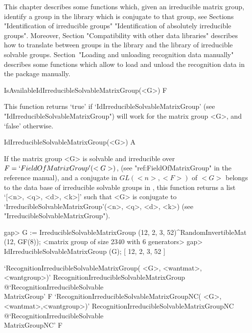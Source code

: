 


This chapter describes some functions which, given an irreducible matrix 
group, identify a group in the {\IRREDSOL} library which is conjugate
to that group, see Sections "Identification of irreducible groups" 
"Identification of absolutely irreducible groups". Moreover, 
Section "Compatibility with other data libraries" describes how to 
translate between groups in the {\IRREDSOL} library and the {\GAP} 
library of irreducible solvable groups. 
Section~"Loading and unloading recognition data manually" describes some 
functions which allow to load and unload the recognition data in the 
{\IRREDSOL} package manually.


\>IsAvailableIdIrreducibleSolvableMatrixGroup(<G>) F

This function returns `true' if `IdIrreducibleSolvableMatrixGroup' (see
"IdIrreducibleSolvableMatrixGroup") will work for the matrix group <G>, and `false' otherwise.


\>IdIrreducibleSolvableMatrixGroup(<G>) A

If the matrix group <G> is solvable and irreducible over $F
= `FieldOfMatrixGroup'(<G>)$, (see "ref:FieldOfMatrixGroup" in the {\GAP} reference manual), and a conjugate in
$GL(<n>, <F>)$ of $<G>$ belongs to the data base of  irreducible solvable groups in
{\IRREDSOL}, this function returns a list `[<n>, <q>, <d>, <k>]' such that <G> is
conjugate to  `IrreducibleSolvableMatrixGroup'(<n>, <q>, <d>, <k>) (see
"IrreducibleSolvableMatrixGroup").

\beginexample
gap> G := IrreducibleSolvableMatrixGroup (12, 2, 3, 52)^RandomInvertibleMat (12, GF(8));
<matrix group of size 2340 with 6 generators>
gap> IdIrreducibleSolvableMatrixGroup (G);
[ 12, 2, 3, 52 ]
\endexample


\>`RecognitionIrreducibleSolvableMatrixGroup(%
   <G>, <wantmat>, <wantgroup>)'%
{RecognitionIrreducibleSolvableMatrixGroup}%
@{`RecognitionIrreducibleSolvable\\MatrixGroup'} F
\>`RecognitionIrreducibleSolvableMatrixGroupNC(%
   <G>, <wantmat>,<wantgroup>)'%
{RecognitionIrreducibleSolvableMatrixGroupNC}%
@{`RecognitionIrreducibleSolvable\\MatrixGroupNC'} F

